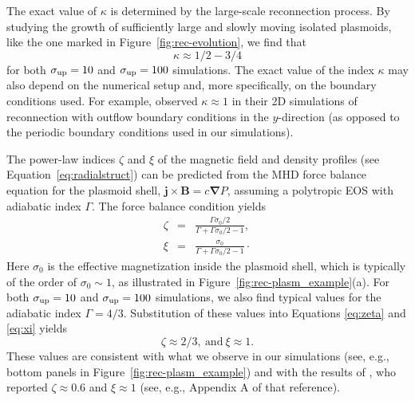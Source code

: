 The exact value of $\kappa$ is determined by the large-scale reconnection process. By studying the growth of sufficiently large and slowly moving isolated plasmoids, like the one marked in Figure~\ref{fig:rec-evolution}, we find that
\begin{equation}
\label{eq:kappa}
    \kappa\approx 1/2 - 3/4
\end{equation}
for both $\sigma_{\rm up} = 10$ and $\sigma_{\rm up} = 100$ simulations. The exact value of the index $\kappa$ may also depend on the numerical setup and, more specifically, on the boundary conditions used. For example, \cite{2016MNRAS.462...48S} observed $\kappa\approx 1$ 
in their 2D simulations of reconnection with outflow boundary conditions in the
$y$-direction (as opposed to the periodic boundary conditions used in our simulations).


The power-law indices $\zeta$ and $\xi$ of the magnetic field and density profiles (see Equation~\eqref{eq:radialstruct}) can be predicted from the MHD force balance equation for the plasmoid shell, $\bm{j}\times\bm{B}=c{\bm \nabla} P$, assuming a polytropic EOS with adiabatic index $\Gamma$. The force balance condition yields
\begin{eqnarray}
    \label{eq:zeta}
    \zeta & = & \frac{\Gamma\sigma_0/2}{\Gamma + \Gamma\sigma_0/2 - 1}, \\
    \xi & = &  \frac{\sigma_0}{\Gamma + \Gamma\sigma_0/2 - 1} \cdot
    \label{eq:xi}
\end{eqnarray}
Here $\sigma_0$ is the effective magnetization inside the plasmoid shell, which is typically of the order of $\sigma_0\sim 1$, as illustrated in Figure~\ref{fig:rec-plasm_example}(a). For both $\sigma_{\rm up} = 10$ and $\sigma_{\rm up} = 100$ simulations, we also find typical values for the adiabatic index $\Gamma=4/3$. Substitution of these values into Equations \eqref{eq:zeta} and \eqref{eq:xi} yields
\begin{equation}
    \zeta \approx 2/3,~\text{and}~\xi \approx 1.
\end{equation}
These values are consistent with what we observe in our simulations (see, e.g., bottom panels in Figure~\ref{fig:rec-plasm_example}) and with the results of \cite{2016MNRAS.462...48S}, who reported $\zeta\approx 0.6$ and $\xi \approx 1$ (see, e.g., Appendix A of that reference).


